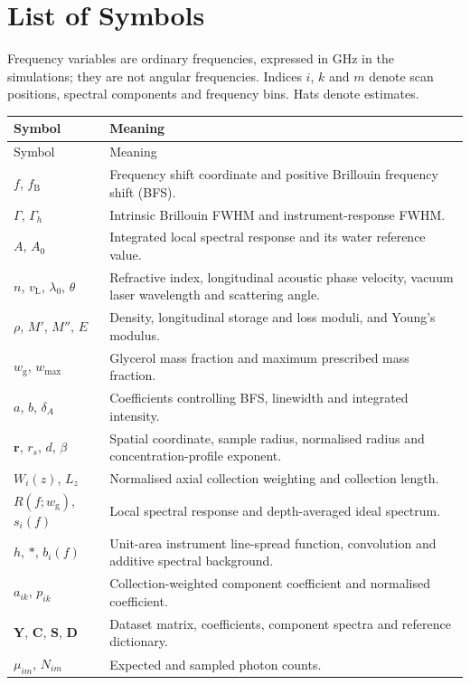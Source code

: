 \documentclass[11pt]{article}
\newcommand{\wg}{w_{\mathrm g}}
\newcommand{\wmax}{w_{\max}}
\begin{document}
\section*{List of Symbols}
Frequency variables are ordinary frequencies, expressed in GHz in the simulations; they are not angular frequencies. Indices $i$, $k$ and $m$ denote scan positions, spectral components and frequency bins. Hats denote estimates.
\small
\begin{longtable}{@{}p{}p{}@{}}
\toprule Symbol & Meaning \\ \midrule\endfirsthead
\toprule Symbol & Meaning \\ \midrule\endhead
$f$, $f_{\mathrm B}$ & Frequency shift coordinate and positive Brillouin frequency shift (BFS). \\
$\Gamma$, $\Gamma_h$ & Intrinsic Brillouin FWHM and instrument-response FWHM. \\
$A$, $A_0$ & Integrated local spectral response and its water reference value. \\
$n$, $v_{\mathrm L}$, $\lambda_0$, $\theta$ & Refractive index, longitudinal acoustic phase velocity, vacuum laser wavelength and scattering angle. \\
$\rho$, $M'$, $M''$, $E$ & Density, longitudinal storage and loss moduli, and Young's modulus. \\
$\wg$, $\wmax$ & Glycerol mass fraction and maximum prescribed mass fraction. \\
$a$, $b$, $\delta_A$ & Coefficients controlling BFS, linewidth and integrated intensity. \\
$\mathbf r$, $r_s$, $d$, $\beta$ & Spatial coordinate, sample radius, normalised radius and concentration-profile exponent. \\
$W_i(z)$, $L_z$ & Normalised axial collection weighting and collection length. \\
$R(f;\wg)$, $s_i(f)$ & Local spectral response and depth-averaged ideal spectrum. \\
$h$, $*$, $b_i(f)$ & Unit-area instrument line-spread function, convolution and additive spectral background. \\
$a_{ik}$, $p_{ik}$ & Collection-weighted component coefficient and normalised coefficient. \\
$\mathbf Y$, $\mathbf C$, $\mathbf S$, $\mathbf D$ & Dataset matrix, coefficients, component spectra and reference dictionary. \\
$\mu_{im}$, $N_{im}$ & Expected and sampled photon counts. \\

\end{longtable}
\end{document}
